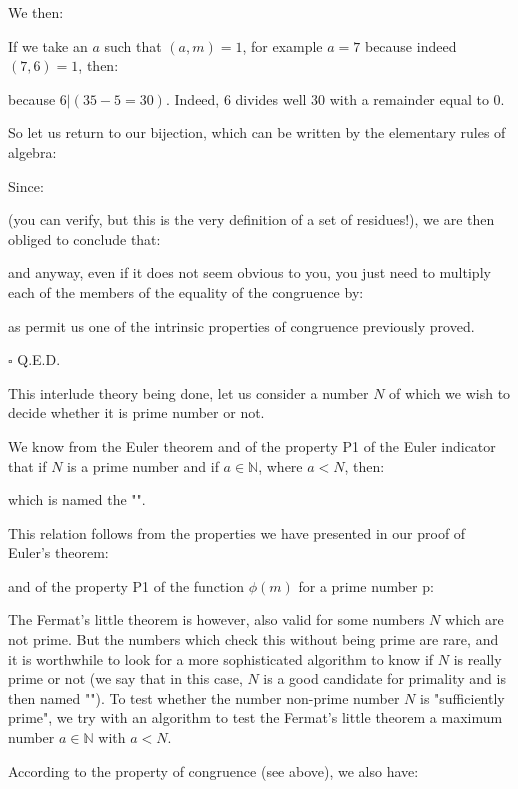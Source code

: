 \begin{dem}
\begin{tcolorbox}[colframe=black,colback=white,sharp corners]
	We then:
	
	If we take an $a$ such that $(a,m)=1$, for example $a=7$ because indeed $(7,6)=1$, then:
	
	because $6|(35-5=30)$. Indeed, $6$ divides well $30$ with a remainder equal to $0$.
	\end{tcolorbox}
	So let us return to our bijection, which can be written by the elementary rules of algebra:
	
	Since:
	
	(you can verify, but this is the very definition of a set of residues!), we are then obliged to conclude that:
	
	and anyway, even if it does not seem obvious to you, you just need to multiply each of the members of the equality of the congruence by:
	
	as permit us one of the intrinsic properties of congruence previously proved.
	\begin{flushright}
		$\square$  Q.E.D.
	\end{flushright}
	\end{dem}
	This interlude theory being done, let us consider a number $N$ of which we wish to decide whether it is prime number or not.

	We know from the Euler theorem and of the property P1 of the Euler indicator that if $N$ is a prime number and if $a\in\mathbb{N}$, where $a<N$, then:
	
	which is named the "".
	\begin{tcolorbox}[title=Remark,colframe=black,arc=10pt]
	This relation follows from the properties we have presented in our proof of Euler's theorem:
	
	and of the property P1 of the function $\phi(m)$ for a prime number p:
	
	\end{tcolorbox}
	The Fermat's little theorem is however, also valid for some numbers $N$ which are not prime. But the numbers which check this without being prime are rare, and it is worthwhile to look for a more sophisticated algorithm to know if $N$ is really prime or not (we say that in this case, $N$ is a good candidate for primality and is then named ""). To test whether the number non-prime number $N$ is "sufficiently prime", we try with an algorithm to test the Fermat's little theorem a maximum number $a\in\mathbb{N}$ with $a<N$.
	
	According to the property of congruence (see above), we also have:
	
